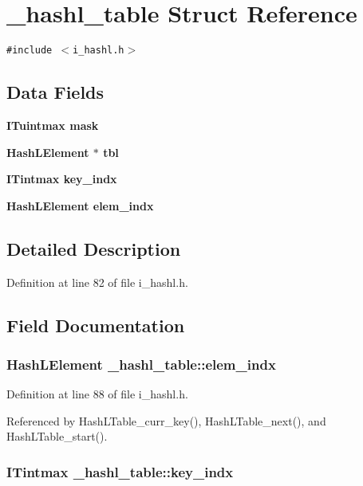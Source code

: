 \section{\_\-hashl\_\-table Struct Reference}
\label{struct__hashl__table}
{\tt \#include $<$i\_\-hashl.h$>$}

\subsection*{Data Fields}
\begin{CompactItemize}
\item 
\bf{ITuintmax} \bf{mask}
\item 
\bf{Hash\-LElement} $\ast$ \bf{tbl}
\item 
\bf{ITintmax} \bf{key\_\-indx}
\item 
\bf{Hash\-LElement} \bf{elem\_\-indx}
\end{CompactItemize}


\subsection{Detailed Description}




Definition at line 82 of file i\_\-hashl.h.

\subsection{Field Documentation}
\subsubsection{\setlength{\rightskip}{0pt plus 5cm}\bf{Hash\-LElement} \bf{\_\-hashl\_\-table::elem\_\-indx}}\label{struct__hashl__table_55e4dc41539796f5eca97429c8c8f9bd}




Definition at line 88 of file i\_\-hashl.h.

Referenced by Hash\-LTable\_\-curr\_\-key(), Hash\-LTable\_\-next(), and Hash\-LTable\_\-start().
\subsubsection{\setlength{\rightskip}{0pt plus 5cm}\bf{ITintmax} \bf{\_\-hashl\_\-table::key\_\-indx}}\label{struct__hashl__table_22166477a60c84679b218e0a15a89fc8}




